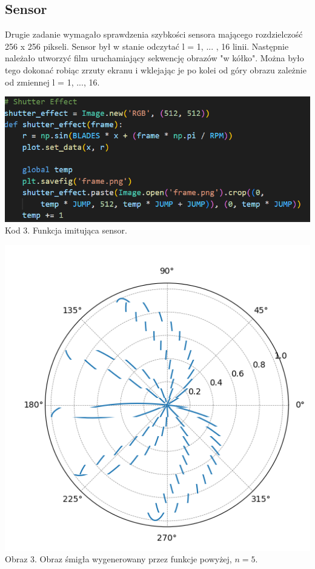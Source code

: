 \documentclass[14pt]{article}
\begin{document}
%
\subsection{Sensor}
Drugie zadanie wymagało sprawdzenia szybkości sensora mającego
rozdzielczość 256 x 256 pikseli. Sensor był w stanie odczytać 
l = 1, ... , 16 linii. Następnie należało utworzyć film 
uruchamiający sekwencję obrazów "w kółko". 
Można było tego dokonać robiąc zrzuty ekranu i
wklejając je po kolei od góry obrazu zależnie od 
zmiennej l = 1, ..., 16.

\begin{center}
    \vspace{0.5cm}
    \includegraphics[scale=0.55]{images/shutter.png}
    \\ \small Kod 3. Funkcja imitująca sensor.

    \newpage
    \includegraphics[scale=0.55]{images/shutter_effect.png}
    \\ \small Obraz 3. Obraz śmigła wygenerowany przez funkcje powyżej, $n = 5$.
\end{center}
\end{document}
